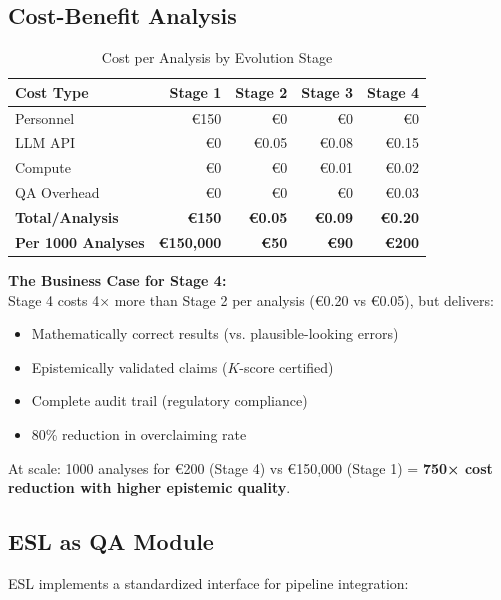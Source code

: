 \documentclass[11pt,a4paper]{article}
\begin{document}
\subsection{Cost-Benefit Analysis}

\begin{table}[h]
\centering
\caption{Cost per Analysis by Evolution Stage}
\label{tab:cost}
\begin{tabular}{lrrrr}
\toprule
\textbf{Cost Type} & \textbf{Stage 1} & \textbf{Stage 2} & \textbf{Stage 3} & \textbf{Stage 4} \\
\midrule
Personnel & €150 & €0 & €0 & €0 \\
LLM API & €0 & €0.05 & €0.08 & €0.15 \\
Compute & €0 & €0 & €0.01 & €0.02 \\
QA Overhead & €0 & €0 & €0 & €0.03 \\
\midrule
\textbf{Total/Analysis} & \textbf{€150} & \textbf{€0.05} & \textbf{€0.09} & \textbf{€0.20} \\
\textbf{Per 1000 Analyses} & \textbf{€150,000} & \textbf{€50} & \textbf{€90} & \textbf{€200} \\
\bottomrule
\end{tabular}
\end{table}

\begin{insightbox}
\textbf{The Business Case for Stage 4:} \\
Stage 4 costs 4× more than Stage 2 per analysis (€0.20 vs €0.05), but delivers:
\begin{itemize}
    \item Mathematically correct results (vs. plausible-looking errors)
    \item Epistemically validated claims ($K$-score certified)
    \item Complete audit trail (regulatory compliance)
    \item 80\% reduction in overclaiming rate
\end{itemize}
At scale: 1000 analyses for €200 (Stage 4) vs €150,000 (Stage 1) = \textbf{750× cost reduction with higher epistemic quality}.
\end{insightbox}

\subsection{ESL as QA Module}

ESL implements a standardized interface for pipeline integration:
\end{document}
